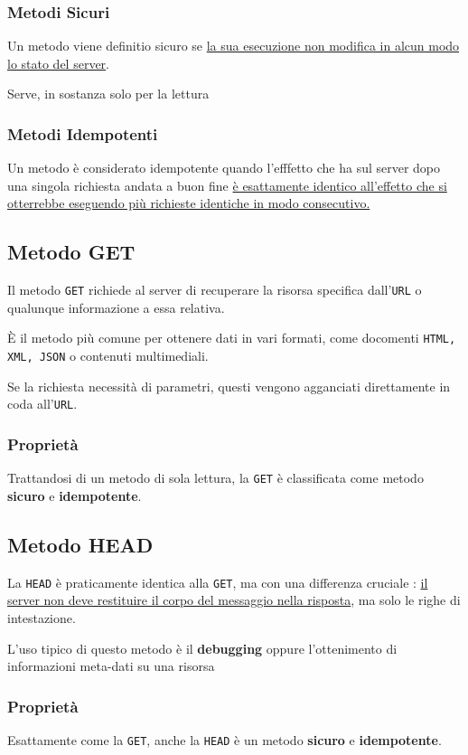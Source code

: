 \subsubsection{Metodi Sicuri}
Un metodo viene definitio sicuro se \uline{la sua esecuzione non modifica in alcun modo lo stato del server}.

Serve, in sostanza solo per la lettura

\subsubsection{Metodi Idempotenti}
Un metodo è considerato idempotente quando l'efffetto che ha sul server dopo una singola richiesta andata a buon fine   \uline{è esattamente identico all'effetto che si otterrebbe eseguendo più richieste identiche in modo consecutivo.}

\subsection{Metodo GET}
Il metodo \texttt{GET} richiede al server di recuperare la risorsa specifica dall'\texttt{URL} o qualunque informazione a essa relativa.

È il metodo più comune per ottenere dati in vari formati, come docomenti \texttt{HTML, XML, JSON} o contenuti multimediali.

Se la richiesta necessità di parametri, questi vengono agganciati direttamente in coda all'\texttt{URL}.

\subsubsection{Proprietà}
Trattandosi di un metodo di sola lettura, la \texttt{GET} è classificata come metodo \textbf{sicuro} e \textbf{idempotente}.

\subsection{Metodo HEAD}
La \texttt{HEAD} è praticamente identica alla \texttt{GET}, ma con una differenza cruciale : \uline{il server non deve restituire il corpo del messaggio nella risposta}, ma solo le righe di intestazione.

L'uso tipico di questo metodo è il \textbf{debugging} oppure l'ottenimento di informazioni meta-dati su una risorsa

\subsubsection{Proprietà}
Esattamente come la \texttt{GET}, anche la \texttt{HEAD} è un metodo \textbf{sicuro} e \textbf{idempotente}.

